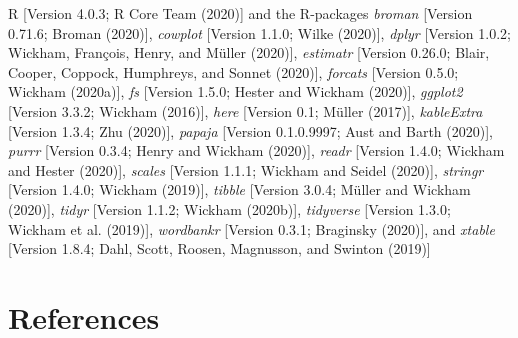 \documentclass[
  english,
  ,man,floatsintext]{apa6}
\begin{document}
R {[}Version 4.0.3; R Core Team (2020){]} and the R-packages \emph{broman} {[}Version 0.71.6; Broman (2020){]}, \emph{cowplot} {[}Version 1.1.0; Wilke (2020){]}, \emph{dplyr} {[}Version 1.0.2; Wickham, François, Henry, and Müller (2020){]}, \emph{estimatr} {[}Version 0.26.0; Blair, Cooper, Coppock, Humphreys, and Sonnet (2020){]}, \emph{forcats} {[}Version 0.5.0; Wickham (2020a){]}, \emph{fs} {[}Version 1.5.0; Hester and Wickham (2020){]}, \emph{ggplot2} {[}Version 3.3.2; Wickham (2016){]}, \emph{here} {[}Version 0.1; Müller (2017){]}, \emph{kableExtra} {[}Version 1.3.4; Zhu (2020){]}, \emph{papaja} {[}Version 0.1.0.9997; Aust and Barth (2020){]}, \emph{purrr} {[}Version 0.3.4; Henry and Wickham (2020){]}, \emph{readr} {[}Version 1.4.0; Wickham and Hester (2020){]}, \emph{scales} {[}Version 1.1.1; Wickham and Seidel (2020){]}, \emph{stringr} {[}Version 1.4.0; Wickham (2019){]}, \emph{tibble} {[}Version 3.0.4; Müller and Wickham (2020){]}, \emph{tidyr} {[}Version 1.1.2; Wickham (2020b){]}, \emph{tidyverse} {[}Version 1.3.0; Wickham et al. (2019){]}, \emph{wordbankr} {[}Version 0.3.1; Braginsky (2020){]}, and \emph{xtable} {[}Version 1.8.4; Dahl, Scott, Roosen, Magnusson, and Swinton (2019){]}

\newpage

\hypertarget{references}{%
\section{References}\label{references}}

\begingroup
\setlength{\parindent}{-0.5in}
\setlength{\leftskip}{0.5in}
\end{document}
